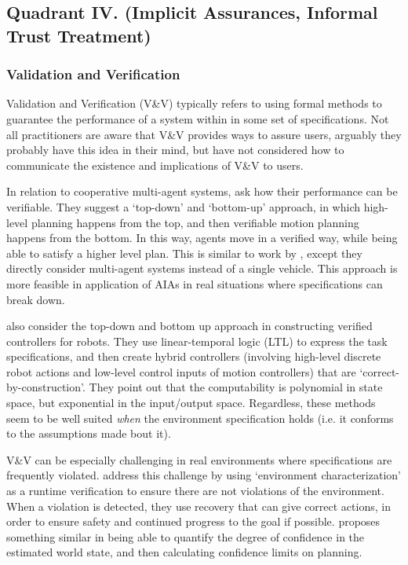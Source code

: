\subsection{Quadrant IV. (Implicit Assurances, Informal Trust Treatment)}\label{sec:q4}

\subsubsection{Validation and Verification} \label{sec:VV}
    Validation and Verification (V\&V) typically refers to using formal methods to guarantee the performance of a system within in some set of specifications. Not all practitioners are aware that V\&V provides ways to assure users, arguably they probably have this idea in their mind, but have not considered how to communicate the existence and implications of V\&V to users.

    In relation to cooperative multi-agent systems, \citet{Da_Silva2016-qb} ask how their performance can be verifiable. They suggest a `top-down' and `bottom-up' approach, in which high-level planning happens from the top, and then verifiable motion planning happens from the bottom. In this way, agents move in a verified way, while being able to satisfy a higher level plan. This is similar to work by \citet{Conner2007-uw}, except they directly consider multi-agent systems instead of a single vehicle. This approach is more feasible in application of AIAs in real situations where specifications can break down.

    \citet{Kress-Gazit2009-wf} also consider the top-down and bottom up approach in constructing verified controllers for robots. They use linear-temporal logic (LTL) to express the task specifications, and then create hybrid controllers (involving high-level discrete robot actions and low-level control inputs of motion controllers) that are `correct-by-construction'. They point out that the computability is polynomial in state space, but exponential in the input/output space. Regardless, these methods seem to be well suited \emph{when} the environment specification holds (i.e. it conforms to the assumptions made bout it).

    V\&V can be especially challenging in real environments where specifications are frequently violated. \citet{Weng_Wong2014-tj} address this challenge by using `environment characterization' as a runtime verification to ensure there are not violations of the environment. When a violation is detected, they use recovery that can give correct actions, in order to ensure safety and continued progress to the goal if possible. \citet{Nishi2016-zq} proposes something similar in being able to quantify the degree of confidence in the estimated world state, and then calculating confidence limits on planning.

